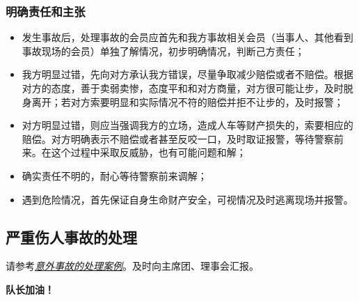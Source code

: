 \documentclass[UTF8]{ctexart}
\begin{document}
\subsubsection{明确责任和主张}

\begin{itemize}[nosep,left=2em]
    \item 发生事故后，处理事故的会员应首先和我方事故相关会员（当事人、其他看到事故现场的会员）单独了解情况，初步明确情况，判断己方责任；
    \item 我方明显过错，先向对方承认我方错误，尽量争取减少赔偿或者不赔偿。根据对方的态度，善于卖弱卖惨，态度平和和对方商量，对方很可能让步，及时脱身离开；若对方索要明显和实际情况不符的赔偿并拒不让步的，及时报警；
    \item 对方明显过错，则应当强调我方的立场，造成人车等财产损失的，索要相应的赔偿。对方明确表示不赔偿或者甚至反咬一口，及时取证报警，等待警察前来。在这个过程中采取反威胁，也有可能问题和解；
    \item 确实责任不明的，耐心等待警察前来调解；
    \item 遇到危险情况，首先保证自身生命财产安全，可视情况及时逃离现场并报警。
\end{itemize}

\subsection{严重伤人事故的处理}

请参考\href{https://www.chexie.net/bbs/content/?bid=7&tid=839#5}{\textit{意外事故的处理案例}}。及时向主席团、理事会汇报。


\center\Large{\color{red}\textbf{队长加油！}}
\end{document}
